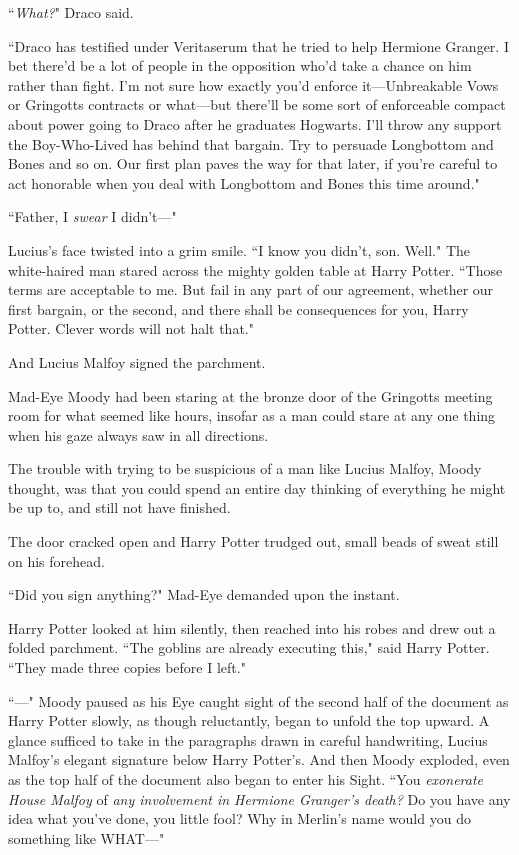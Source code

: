 ``\emph{What?}" Draco said.

``Draco has testified under Veritaserum that he tried to help Hermione Granger. I bet there'd be a lot of people in the opposition who'd take a chance on him rather than fight. I'm not sure how exactly you'd enforce it—Unbreakable Vows or Gringotts contracts or what—but there'll be some sort of enforceable compact about power going to Draco after he graduates Hogwarts. I'll throw any support the Boy-Who-Lived has behind that bargain. Try to persuade Longbottom and Bones and so on. Our first plan paves the way for that later, if you're careful to act honorable when you deal with Longbottom and Bones this time around."

``Father, I \emph{swear} I didn't—"

Lucius's face twisted into a grim smile. ``I know you didn't, son. Well." The white-haired man stared across the mighty golden table at Harry Potter. ``Those terms are acceptable to me. But fail in any part of our agreement, whether our first bargain, or the second, and there shall be consequences for you, Harry Potter. Clever words will not halt that."

And Lucius Malfoy signed the parchment.

\later

Mad-Eye Moody had been staring at the bronze door of the Gringotts meeting room for what seemed like hours, insofar as a man could stare at any one thing when his gaze always saw in all directions.

The trouble with trying to be suspicious of a man like Lucius Malfoy, Moody thought, was that you could spend an entire day thinking of everything he might be up to, and still not have finished.

The door cracked open and Harry Potter trudged out, small beads of sweat still on his forehead.

``Did you sign anything?" Mad-Eye demanded upon the instant.

Harry Potter looked at him silently, then reached into his robes and drew out a folded parchment. ``The goblins are already executing this," said Harry Potter. ``They made three copies before I left."

``—" Moody paused as his Eye caught sight of the second half of the document as Harry Potter slowly, as though reluctantly, began to unfold the top upward. A glance sufficed to take in the paragraphs drawn in careful handwriting, Lucius Malfoy's elegant signature below Harry Potter's. And then Moody exploded, even as the top half of the document also began to enter his Sight. ``You \emph{exonerate House Malfoy} of \emph{any involvement in Hermione Granger's death?} Do you have any idea what you've done, you little fool? Why in Merlin's name would you do something like WHAT—"

